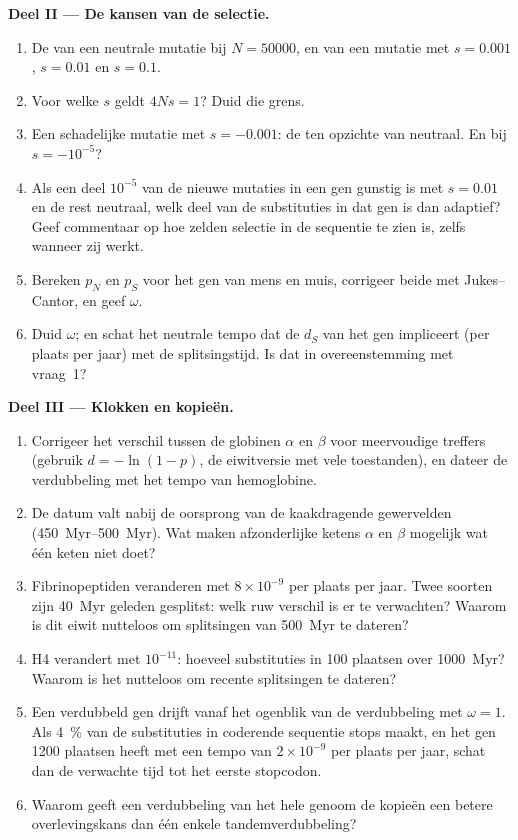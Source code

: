 \begin{problem}
\medskip
\noindent\textbf{Deel II --- De kansen van de selectie.}
\begin{enumerate}[resume]
  \item De  van een neutrale mutatie bij $N = \num{50000}$,
        en van een mutatie met $s = 0.001$, $s = 0.01$ en $s = 0.1$.
  \item Voor welke $s$ geldt $4Ns = 1$? Duid die grens.
  \item Een schadelijke mutatie met $s = -0.001$: de  ten
        opzichte van neutraal. En bij $s = -10^{-5}$?
  \item Als een deel $10^{-5}$ van de nieuwe mutaties in een gen gunstig
        is met $s = 0.01$ en de rest neutraal, welk deel van de
        substituties in dat gen is dan adaptief? Geef commentaar op hoe
        zelden selectie in de sequentie te zien is, zelfs wanneer zij werkt.
  \item Bereken $p_{N}$ en $p_{S}$ voor het gen van mens en muis,
        corrigeer beide met Jukes--Cantor, en geef $\omega$.
  \item Duid $\omega$; en schat het neutrale tempo dat de $d_{S}$ van
        het gen impliceert (per plaats per jaar) met de splitsingstijd.
        Is dat in overeenstemming met vraag~1?
\end{enumerate}

\medskip
\noindent\textbf{Deel III --- Klokken en kopieën.}
\begin{enumerate}[resume]
  \item Corrigeer het verschil tussen de globinen $\alpha$ en $\beta$
        voor meervoudige treffers (gebruik $d = -\ln(1 - p)$, de
        eiwitversie met vele toestanden), en dateer de verdubbeling met
        het tempo van hemoglobine.
  \item De datum valt nabij de oorsprong van de kaakdragende
        gewervelden (\qtyrange{450}{500}{Myr}). Wat maken afzonderlijke
        ketens $\alpha$ en $\beta$ mogelijk wat één keten niet doet?
  \item Fibrinopeptiden veranderen met $8\times 10^{-9}$ per plaats per
        jaar. Twee soorten zijn \qty{40}{Myr} geleden gesplitst: welk
        ruw verschil is er te verwachten? Waarom is dit eiwit nutteloos
        om splitsingen van \qty{500}{Myr} te dateren?
  \item {} H4 verandert met $10^{-11}$: hoeveel substituties in 100
        plaatsen over \qty{1000}{Myr}? Waarom is het nutteloos om
        recente splitsingen te dateren?
  \item Een verdubbeld gen drijft vanaf het ogenblik van de
        verdubbeling met $\omega = 1$. Als \qty{4}{\%} van de
        substituties in coderende sequentie stops maakt, en het gen
        1200 plaatsen heeft met een tempo van $2\times
        10^{-9}$ per plaats per jaar, schat dan de verwachte tijd tot
        het eerste stopcodon.
  \item Waarom geeft een verdubbeling van het hele genoom de kopieën
        een betere overlevingskans dan één enkele tandemverdubbeling?
\end{enumerate}


\end{problem}
